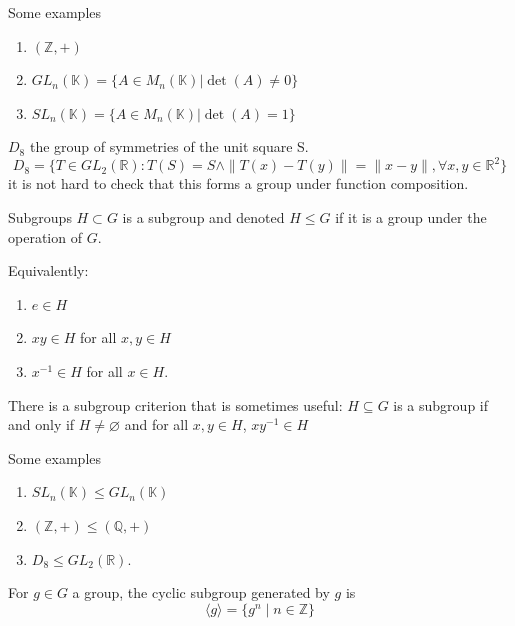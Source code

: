 \documentclass[12pt]{article}
\begin{document}
\begin{example}
    Some examples
    \begin{enumerate}
        \item $(\mathbb Z, +)$
        \item $GL_n(\mathbb K) = \{ A \in M_n(\mathbb K) | \det(A) \neq 0 \}$
        \item $SL_n(\mathbb K) = \{ A \in M_n(\mathbb K) | \det(A) = 1 \}$
    \end{enumerate}
\end{example}
\begin{example}
    $D_8$ the group of symmetries of the unit square S.
    \[ D_8 = \{ T \in GL_2(\mathbb R) : T(S) = S \wedge \| T(x) - T(y) \| = \| x - y \|, \forall x, y \in \mathbb R^2 \} \]
    it is not hard to check that this forms a group under function composition.
\end{example}
\begin{definition}
    Subgroups $H \subset G$ is a subgroup and denoted $H \leq G$ if it is a group
    under the operation of $G$.

    Equivalently:
    \begin{enumerate}
        \item $e \in H$
        \item $xy \in H$ for all $x, y \in H$
        \item $x^{-1} \in H$ for all $x \in H$.
    \end{enumerate}
\end{definition}
\begin{remark}
    There is a subgroup criterion that is sometimes useful:
    $H \subseteq G$ is a subgroup if and only if $H \neq \varnothing$
    and for all $x, y \in H$, $xy^{-1} \in H$
\end{remark}
\begin{example}
    Some examples
    \begin{enumerate}
        \item $SL_n(\mathbb K) \leq GL_n(\mathbb K)$
        \item $(\mathbb Z, +) \leq (\mathbb Q, +)$
        \item $D_8 \leq GL_2(\mathbb R)$.
    \end{enumerate}
\end{example}

\begin{definition}
    For $g \in G$ a group, the cyclic subgroup generated by $g$ is
    \[ \langle g \rangle = \{ g^n \mid n \in \mathbb Z \} \]
\end{definition}
\end{document}
